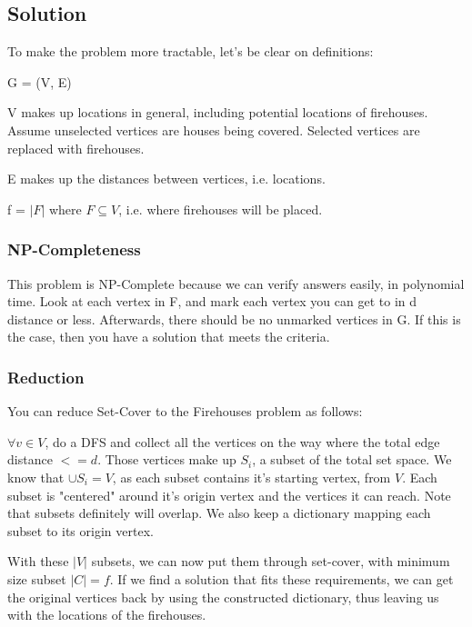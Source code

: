 \subsection*{Solution}

To make the problem more tractable, let's be clear on definitions:

G = (V, E)

V makes up locations in general, including potential locations of firehouses. Assume unselected vertices are houses being covered. Selected vertices are replaced with firehouses.

E makes up the distances between vertices, i.e. locations. 

f = $|F|$ where $F \subseteq V$, i.e. where firehouses will be placed.

\subsubsection*{NP-Completeness}

This problem is NP-Complete because we can verify answers easily, in polynomial time. Look at each vertex in F, and mark each vertex you can get to in d distance or less. Afterwards, there should be no unmarked vertices in G. If this is the case, then you have a solution that meets the criteria.

\subsubsection*{Reduction}

You can reduce Set-Cover to the Firehouses problem as follows:

$\forall v \in V$, do a DFS and collect all the vertices on the way where the total edge distance $< = d$. Those vertices make up $S_i$, a subset of the total set space. We know that $\cup S_i = V$, as each subset contains it's starting vertex, from $V$. Each subset is "centered" around it's origin vertex and the vertices it can reach. Note that subsets definitely will overlap. We also keep a dictionary mapping each subset to its origin vertex.

With these $|V|$ subsets, we can now put them through set-cover, with minimum size subset $|C| = f$. If we find a solution that fits these requirements, we can get the original vertices back by using the constructed dictionary, thus leaving us with the locations of the firehouses.
